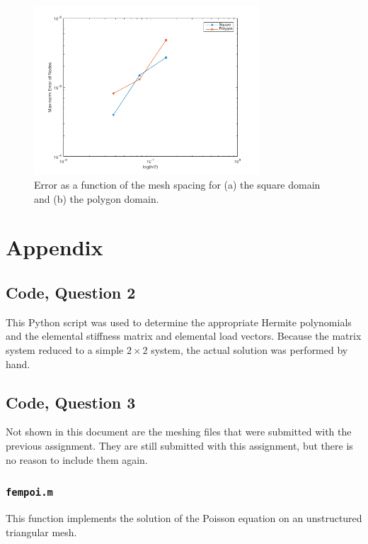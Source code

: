 \documentclass[10pt]{article}
\begin{document}
\begin{figure}[H]
\centering
\includegraphics[width=0.75\textwidth]{convergence.png}
\caption{Error as a function of the mesh spacing for (a) the square domain and (b) the polygon domain.}
\label{fig:10}
\end{figure}

\section{Appendix}

\subsection{Code, Question 2}

This Python script was used to determine the appropriate Hermite polynomials and the elemental stiffness matrix and elemental load vectors. Because the matrix system reduced to a simple \(2\times 2\) system, the actual solution was performed by hand.



\subsection{Code, Question 3}

Not shown in this document are the meshing files that were submitted with the previous assignment. They are still submitted with this assignment, but there is no reason to include them again.

\subsubsection{\tt fempoi.m}
This function implements the solution of the Poisson equation on an unstructured triangular mesh. 

\end{document}
